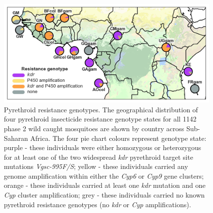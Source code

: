\documentclass[a4paper,11pt,abstracton,hidelinks]{scrartcl}
\begin{document}
\begin{figure}[H]
	\begin{center}
		\includegraphics*[width=6.3in]{artwork/pyrethroid_resistance_simplified.jpg}
	\end{center}
	\caption{Pyrethroid resistance genotypes. The geographical distribution of four pyrethroid insecticide resistance genotype states for all 1142 phase 2 wild caught mosquitoes are shown by country across Sub-Saharan Africa. The four pie chart colours represent genotype state: purple - these individuals were either homozygous or heterozygous for at least one of the two widespread \textit{kdr} pyrethroid target site mutations \textit{Vgsc-995F/S}; yellow - these individuals carried any genome amplification within either the \textit{Cyp6} or \textit{Cyp9} gene clusters; orange - these individuals carried at least one \textit{kdr} mutation and one \textit{Cyp} cluster amplification; grey - these individuals carried no known pyrethroid resistance genotypes (no \textit{kdr} or \textit{Cyp} amplifications).}
	\label{fig:ir}
\end{figure}
\end{document}
